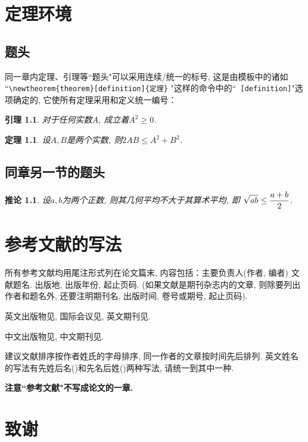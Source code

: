 \documentclass[notitlepage,cs4size,punct,oneside]{ctexrep}
\numberwithin{equation}{chapter}
\theoremstyle{mystyle}
\newtheorem{theorem}[definition]{\hspace{2em}定理}
\newtheorem{lemma}[definition]{\hspace{2em}引理}
\newtheorem{corollary}[definition]{\hspace{2em}推论}
\begin{document}
\chapter{定理环境}

\section{题头}
同一章内定理、引理等``题头"可以采用连续/统一的标号, 这是由模板中的诸如
``\verb+\newtheorem{theorem}[definition]{定理}+ "这样的命令中的``\verb+ [definition]+"选项确定的, 它使所有定理采用和定义统一编号：
\begin{lemma}\label{L1} 对于任何实数$A$, 成立着$A^2\geq 0$.
\end{lemma}


\begin{theorem}\label{T1} 设$A,B$是两个实数, 则$2AB\leq A^2+B^2$.
\end{theorem}

\section{同章另一节的题头}

\begin{corollary}\label{P1} 设$a,b$为两个正数, 则其几何平均不大于其算术平均, 即
$\displaystyle \sqrt{ab}\leq {a+b\over 2}$.
\end{corollary}

\chapter{参考文献的写法}

所有参考文献均用尾注形式列在论文篇末, 内容包括：主要负责人(作者,
编者) 文献题名. 出版地, 出版年份, 起止页码.
(如果文献是期刊杂志内的文章, 则除要列出作者和题名外, 还要注明期刊名,
出版时间, 卷号或期号, 起止页码).

英文出版物见\cite{HTF}, 国际会议见\cite{ZhangC},
英文期刊见\cite{ChenSX}.

中文出版物见\cite{ChenJX}, 中文期刊见\cite{Su}.

建议文献排序按作者姓氏的字母排序, 同一作者的文章按时间先后排列.
英文姓名的写法有先姓后名(\cite{LiT})和先名后姓(\cite{ChenSX})两种写法,
请统一到其中一种.

\textbf{注意``参考文献"不写成论文的一章. }

\chapter*{\heiti 致谢}
\end{document}
